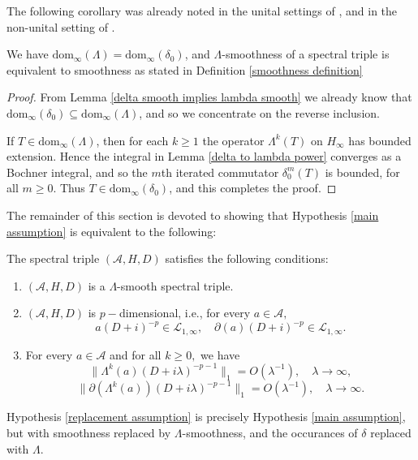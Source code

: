     The following corollary was already noted in the unital settings of \cite[Appendix B]{Connes-Moscovici}, \cite[Proposition 6.5]{CPRS2} 
    and in the non-unital setting of \cite[Equation 1.12]{CGRS2}.
    \begin{cor}
        We have $\mathrm{dom}_\infty(\Lambda) = \mathrm{dom}_\infty(\delta_0)$, and $\Lambda$-smoothness { of a spectral triple} is equivalent to smoothness { as stated in Definition \ref{smoothness definition}}
    \end{cor}
    \begin{proof}
        From Lemma \ref{delta smooth implies lambda smooth} we already know that $\mathrm{dom}_\infty(\delta_0) \subseteq \mathrm{dom}_\infty(\Lambda)$, and so we concentrate 
        on the reverse inclusion.
        
        If $T \in \mathrm{dom}_\infty(\Lambda)$, then for each $k\geq 1$ the operator $\Lambda^k(T)$ on $H_\infty$ has bounded extension. Hence the integral
        in Lemma \ref{delta to lambda power} converges as a Bochner integral, and so the $m$th iterated commutator $\delta_0^m(T)$ is bounded, for all $m\geq 0$.
        Thus $T \in \mathrm{dom}_\infty(\delta_0)$, and this completes the proof.
    \end{proof}
    
    The remainder of this section is devoted to showing that Hypothesis \ref{main assumption} is equivalent to the following:
    \begin{hyp}\label{replacement assumption} 
        The spectral triple $(\mathcal{A},H,D)$ satisfies the following conditions:
        \begin{enumerate}[{\rm (i)}]
            \item\label{rass0} $(\mathcal{A},H,D)$ is a $\Lambda$-smooth spectral triple.
            \item\label{rass1} $(\mathcal{A},H,D)$ is $p-$dimensional, i.e., for every $a\in\mathcal{A},$
                               $$a(D+i)^{-p}\in\mathcal{L}_{1,\infty},\quad \partial(a)(D+i)^{-p}\in\mathcal{L}_{1,\infty}.$$
            \item\label{rass2} For every $a\in\mathcal{A}$ and for all $k\geq0,$ we have
                               $$\Big\|\Lambda^k(a)(D+i\lambda)^{-p-1}\Big\|_1=O(\lambda^{-1}),\quad\lambda\to\infty,$$
                               $$\Big\|\partial(\Lambda^k(a))(D+i\lambda)^{-p-1}\Big\|_1=O(\lambda^{-1}),\quad\lambda\to\infty.$$
            \end{enumerate}
    \end{hyp}
    Hypothesis \ref{replacement assumption} is precisely Hypothesis \ref{main assumption}, but with smoothness replaced by $\Lambda$-smoothness, and the occurances of $\delta$
    replaced with $\Lambda$.    

